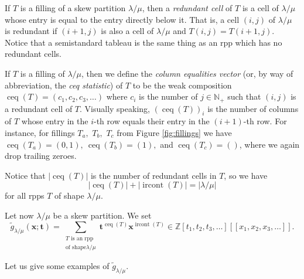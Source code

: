 \documentclass[numbers=enddot,12pt,final,onecolumn,notitlepage]{scrartcl}%
\theoremstyle{definition}
\let\sumnonlimits\sum
\renewcommand{\sum}{\sumnonlimits\limits}
\def\ceq{{\operatorname{ceq}}}
\def\ircont{{\operatorname{ircont}}}
\def\t{{\mathbf{t}}}
\def\lm{{\lambda/\mu}}
\def\Z{{\mathbb{Z}}}
\begin{document}
 If $T$ is a filling of a skew partition $\lm$,
then a \textit{redundant cell} of $T$ is a cell of $\lm$ whose entry is equal to the entry directly below it. That is, a cell $\left(  i,j\right)  $
of $\lm$ is redundant if $\left(  i+1,j\right)  $ is also a cell of $\lm$ and 
$T\left(  i,j\right)  =T\left(  i+1,j\right)  $. Notice that a semistandard
tableau is the same thing as an rpp which has no redundant
cells.


 If $T$ is a filling of $\lm$,
then we define the \textit{column equalities vector} (or,
by way of abbreviation, the \textit{ceq statistic})
of $T$ to be the weak composition
$\operatorname{ceq}\left(  T\right)=\left(c_1,c_2,c_3,\dots\right)$
where $c_i$ is the number of $j\in\mathbb{N}_{+}$ such that $\left(  i,j\right)$ is a redundant cell of $T$. Visually speaking, $\left(  \operatorname{ceq}\left(  T\right)  \right)
_{i}$ is the number of columns of $T$ whose entry in the $i$-th row equals
their entry in the $\left(  i+1\right)  $-th row. For instance, for fillings $T_a,$ $T_b,$ $T_c$ from Figure \ref{fig:fillings} we have $\ceq(T_a)=(0,1),\ \ceq(T_b)=(1),$ and $\ceq(T_c)=()$, where we again drop trailing zeroes.

Notice that $\left|\ceq(T)\right|$ is the number of redundant cells in $T$, so we have 
\begin{equation}\label{eq:sum.of.ceq.and.ircont}
 \left|\ceq(T)\right|+\left|\ircont(T)\right|=\left|\lm\right|
\end{equation}
 for all rpps $T$ of shape $\lm$. 




Let now $\lambda/\mu$ be a skew partition. We set%
\[
\widetilde{g}_{\lambda/\mu}(\mathbf{x};\t)=\sum_{\substack{T\text{ is an rpp}\\\text{of shape
}\lm  }}\mathbf{t}^{\operatorname*{ceq}\left(
T\right)  }\mathbf{x}^{\operatorname*{ircont}\left(  T\right)  }
\in \Z\left[t_1, t_2, t_3, \ldots\right]\left[\left[x_1, x_2, x_3, \ldots\right]\right] .
\]


Let us give some examples of $\widetilde{g}_{\lambda/\mu}$.
\end{document}
